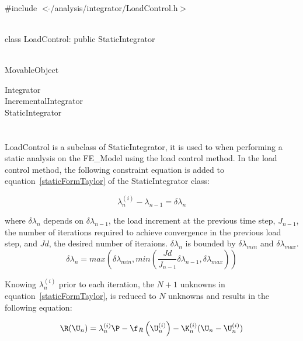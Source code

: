 
   \\
\#include $<\tilde{ }$/analysis/integrator/LoadControl.h$>$  


  \\
class LoadControl: public StaticIntegrator  


 \\
MovableObject 

\indent\indent Integrator \\
\indent\indent\indent IncrementalIntegrator \\
\indent\indent\indent\indent StaticIntegrator \\
\indent\indent\indent\indent{} \\

 \\ 
\indent LoadControl is a subclass of StaticIntegrator, it is
used to when performing a static analysis on the FE\_Model using the
load control method. In the load control method, the following
constraint equation is added to equation~\ref{staticFormTaylor} of the
StaticIntegrator class: 

$$ 
\lambda_n^{(i)} - \lambda_{n-1} = \delta \lambda_n
$$


\noindent where $\delta \lambda_n$ depends on $\delta \lambda_{n-1}$,
the load increment at the previous time step, $J_{n-1}$,
the number of iterations required to achieve convergence in the
previous load step, and $Jd$, the desired number of iteraions. $\delta
\lambda_n$ is bounded by $\delta \lambda_{min}$  and $\delta \lambda_{max}$. \\


$$ 
\delta \lambda_n = max \left( \delta \lambda_{min}, min \left(
\frac{Jd}{J_{n-1}} \delta \lambda_{n-1}, \delta \lambda_{max} \right) \right)
$$


Knowing $\lambda_n^{(i)}$ prior to each iteration, the $N+1$ unknowns
in equation~\ref{staticFormTaylor}, is reduced to $N$ unknowns and
results in the following equation:

\begin{equation} 
\R(\U_{n}) = \lambda_n^{(i)} \P 
 - \f_{R}\left(\U_{n}^{(i)} \right) - 
\K_n^{(i)} 
(\U_{n} - \U_{n}^{(i)})  
\label{staticFormLoadControl}
\end{equation} 

